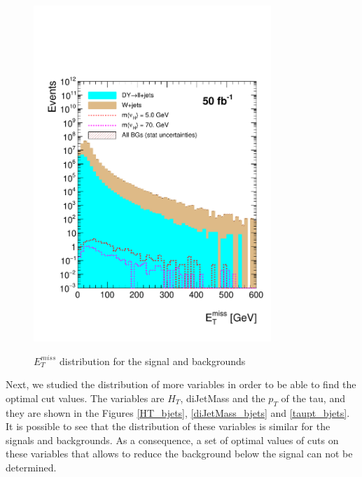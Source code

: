  \begin{figure}[h] 
 \centering
 \caption{$E_T^{miss}$ distribution for the signal and backgrounds}
 \includegraphics[width=0.8\textwidth]{./Capitulos/Analysis/AfterBJets/MET_MET_20} 
 \label{MET_bjets}
 \end{figure}
 
Next, we studied the distribution of more variables in order to be able to find the optimal cut values. The variables are $H_T$, diJetMass and the $p_T$ of the tau, and they are shown in the 
Figures \ref{HT_bjets}, \ref{diJetMass_bjets} and \ref{taupt_bjets}. It is possible to see that the distribution of these variables is similar for the signals and backgrounds. As a consequence, 
a set of optimal values of cuts on these variables that allows to reduce the background below the signal can not be determined.
 
